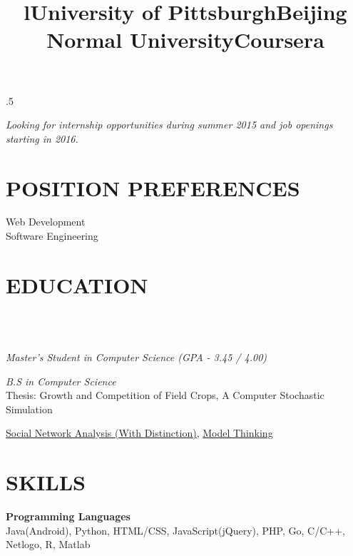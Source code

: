 \begin{resume}

\moveleft.5\hoffset\centerline{\emph{Looking for internship opportunities during summer 2015 and job openings starting in 2016.}}

\section{\textsc{POSITION PREFERENCES}}
    Web Development\\
    Software Engineering
    
\section{\textsc{EDUCATION}}
\begin{formatb}
  \title{l}\\
   \body\\
\end{formatb}

\title{\textbf{University of Pittsburgh}}
\begin{position}
	{\sl Master's Student in Computer Science (GPA - 3.45 / 4.00)}
\end{position}

\title{\textbf{Beijing Normal University}}
\begin{position}
 	{\sl B.S in Computer Science}\\
    Thesis: Growth and Competition of Field Crops, A Computer Stochastic Simulation
\end{position}

\title{\textbf{Coursera}}
\begin{position}
    \href{http://qiaozhang-wordpress.stor.sinaapp.com/uploads/2012/11/SNAcertificate.pdf}{Social Network Analysis (With Distinction)}, \href{http://qiaozhang-wordpress.stor.sinaapp.com/uploads/2012/09/ModelCert.pdf}{Model Thinking}
\end{position}



\section{\textsc{SKILLS}}

\textbf{Programming Languages}\\
Java(Android), Python, HTML/CSS, JavaScript(jQuery), PHP, Go, C/C++, Netlogo, R, Matlab


\end{resume}
